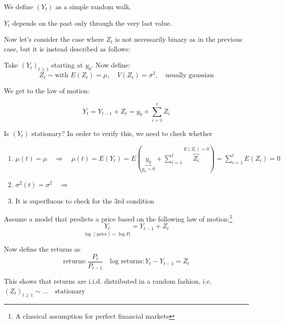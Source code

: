 \documentclass[dvipsnames,12pt]{book}
\begin{document}
            \begin{definition}
                We define \((Y_t)\) as a simple random walk.
            \end{definition}

            \begin{remark}
                \(Y_t\) depends on the past only through the very last value.
            \end{remark}

                Now let's consider the case where \(Z_t\) is not necessarily binary as in the previous case, but it is instead described as follows:

            \begin{definition}
                Take \((Y_t)_{t \geq 1}\) starting at \(y_0\).
                Now define:
                \begin{equation}
                    Z_t \sim \text{with } E(Z_t)=\mu, \quad V(Z_t)=\sigma^2, \quad \text{usually gaussian}
                \end{equation}

                We get to the law of motion:

                \begin{equation}
                    Y_t = Y_{t-1} + Z_t = y_0 + \sum^t_{i=1} Z_i
                \end{equation}
            \end{definition}

            \begin{proposition}
                Is \((Y_t)\) stationary? In order to verify this, we need to check whether 
                \begin{enumerate}[label=\roman*.]
                    \item \( \mu(t) = \mu \quad \Rightarrow \quad \mu(t)=E(Y_t)= E(\underbrace{y_0}_{y_0=0} + \sum^t_{i=1} \overbrace{Z_i}^{E(Z_i)=0}) = \sum^t_{i=1}E(Z_i)=0 \)
                    \item \(\sigma^2(t)=\sigma^2 \quad \Rightarrow \quad \)
                    \item It is superfluous to check for the 3rd condition
                \end{enumerate}
            \end{proposition}

            \begin{example}
                Assume a model that predicts a price based on the following law of motion:\footnote{A classical assumption for perfect financial markets}
                \[
                \underset{\log(\text{price})=\log P_t}{Y_t}= Y_{t-1} + Z_t
                \]

                Now define the returns as
                \[
                \text{returns}: \frac{P_t}{P_{t-1}} \quad \text{log returns}: Y_t-Y_{t-1}= Z_t
                \]

                This shows that returns are i.i.d. distributed in a random fashion, i.e. \((Z_t)_{t \geq 1} \sim \ldots \quad \text{stationary}\)
                
            \end{example}
\end{document}
